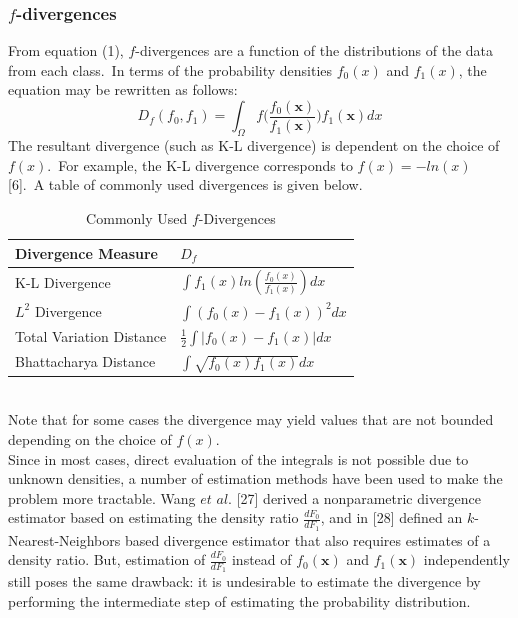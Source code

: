\documentclass{article}
\begin{document}
	\subsubsection{\small $f$-divergences}
	\indent From equation (1), $f$-divergences are a function of the distributions of the data from each class.\ In terms of the probability densities $f_0(x)$ and $f_1(x)$, the equation may be rewritten as follows:\begin{equation}
		 D_f(f_0,f_1) = \int_{\Omega} f\bigg(\frac{f_0(\textbf{x})}{f_1(\textbf{x})}\bigg)f_1(\textbf{x})dx
	\end{equation}The resultant divergence (such as K-L divergence) is dependent on the choice of $f(x)$.\ For example, the K-L divergence corresponds to $f(x) = -ln(x)$ [6].\  A table of commonly used divergences is given below.
	\begin{table}[ht]
	\caption{Commonly Used $f$-Divergences}
	\centering	
	\begin{tabular}[!h]{ |p{5cm}||p{4cm}|  }
		\hline
		Divergence Measure & $D_f$ \\ 
		\hline\hline
		K-L Divergence 	& $\int f_1(x)ln(\frac{f_0(x)}{f_1(x)})dx$ \\
		
		$L^2$ Divergence & $ \int (f_0(x)-f_1(x))^2dx$ \\
		
		Total Variation Distance & $ \frac{1}{2}\int \vert f_0(x)-f_1(x)\vert dx$ \\
		
		Bhattacharya Distance & $\int\sqrt{f_0(x)f_1(x)}dx$\\ 
		\hline 		
	\end{tabular}	
	\end{table}
	\\ [0.5ex]
	\indent Note that for some cases the divergence may yield values that are not bounded depending on the choice of $f(x)$. 
	\\ [0.5ex]
	
	\indent Since in most cases, direct evaluation of the integrals is not possible due to unknown densities, a number of estimation methods have been used to make the problem more tractable. Wang $et$ $al$. [27] derived a nonparametric divergence estimator based on estimating the density ratio $\frac{dF_0}{dF_1}$, and in [28] defined an  $k$-Nearest-Neighbors based divergence estimator that also requires estimates of a density ratio. But, estimation of $\frac{dF_0}{dF_1}$ instead of $f_0(\textbf{x})$ and $f_1(\textbf{x})$ independently still poses the same drawback: it is undesirable to estimate the divergence by performing the intermediate step of estimating the probability distribution.
	\\ [0.5ex]	
	
\end{document}
